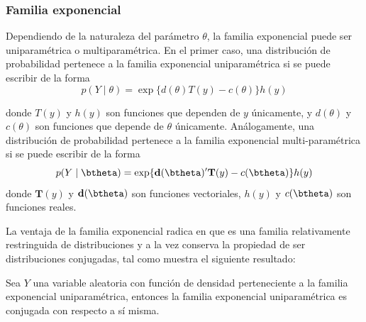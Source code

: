 \subsubsection*{Familia exponencial}

Dependiendo de la naturaleza del parámetro $\theta$, la familia exponencial puede ser uniparamétrica o multiparamétrica. En el primer caso, una distribución de probabilidad pertenece a la familia exponencial uniparamétrica si se puede escribir de la forma
\begin{equation}\label{uniexpo}
p(Y \mid \theta)=\exp\{d(\theta)T(y)-c(\theta)\}h(y)
\end{equation}

donde $T(y)$ y $h(y)$ son funciones que dependen de $y$ únicamente, y $d(\theta)$ y $c(\theta)$ son funciones que depende de $\theta$ únicamente. Análogamente, una distribución de probabilidad pertenece a la familia exponencial multi-paramétrica si se puede escribir de la forma
\begin{equation}\label{multiexpo}
p(Y \mid \btheta)=\exp\{\mathbf{d}(\btheta)'\mathbf{T}(y)-c(\btheta)\}h(y)
\end{equation}
donde $\mathbf{T}(y)$ y $\mathbf{d}(\btheta)$ son funciones vectoriales, $h(y)$ y $c(\btheta)$ son funciones reales.

La ventaja de la familia exponencial radica en que es una familia relativamente restringuida de distribuciones y a la vez conserva la propiedad de ser distribuciones conjugadas, tal como muestra el siguiente resultado:

\begin{Res}\label{FE1}
Sea $Y$ una variable aleatoria con función de densidad perteneciente a la familia exponencial uniparamétrica, entonces la familia exponencial uniparamétrica es conjugada con respecto a sí misma.
\end{Res}

